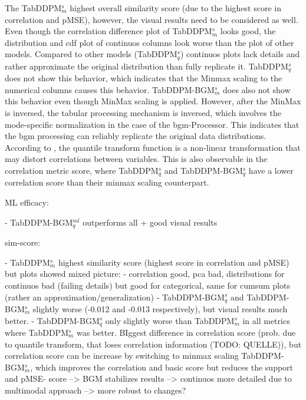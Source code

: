 The TabDDPM$^{s}_m$ highest overall similarity score (due to the highest score in correlation and pMSE), however, the visual results need to be considered as well.
Even though the correlation difference plot of TabDDPM$^{s}_m$ looks good, the distribution and \gls{cdf} plot of continuos columns look worse than the plot of other models. 
Compared to other models (\eg TabDDPM$^{s}_q$) continuos plots lack details and rather approximate the original distribution than fully replicate it.
TabDDPM$^{s}_q$ does not show this behavior, which indicates that the Minmax scaling to the numerical columns causes this behavior.
TabDDPM-BGM$^{s}_m$ does also not show this behavior even though MinMax scaling is applied. 
However, after the MinMax is inversed, the tabular processing mechanism is inversed, which involves the mode-specific normalization in the case of the \gls{bgm}-Processor.
This indicates that the \gls{bgm} processing can reliably replicate the original data distributions.
According to \cite{QuantileTransformer}, the quantile transform function is a non-linear transformation that may distort correlations between variables.
This is also observable in the correlation metric score, where TabDDPM$^{s}_q$ and TabDDPM-BGM$^{s}_q$ have a lower correlation score than their minmax scaling counterpart.




ML efficacy:

- TabDDPM-BGM$^{ml}_q$ outperforms all + good visual results

sim-score:

- TabDDPM$^{s}_m$ highest similarity score (highest score in correlation and pMSE) but plots showed mixed picture: 
	- correlation good, pca bad, distributions for continuos bad (failing details) but good for categorical, same for cumsum plots (rather an approximation/generalization)
- TabDDPM-BGM$^{s}_q$ and TabDDPM-BGM$^{s}_m$ slightly worse (-0.012 and -0.013 respectively), but visual results much better.
- TabDDPM-BGM$^{s}_q$ only slightly worse than TabDDPM$^{s}_m$ in all metrics where TabDDPM$^{s}_m$ was better. BIggest difference in correlation score (prob. due to quantile transform, that loses correlation information (TODO: QUELLE)),
but correlation score can be increase by switching to minmax scaling TabDDPM-BGM$^{s}_m$, which improves the correlation and basic score but reduces the support and pMSE- score
--> BGM stabilizes results --> continuos more detailed due to multimodal approach --> more robust to changes?

